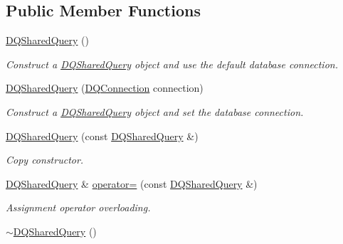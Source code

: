 \subsection*{Public Member Functions}
\begin{DoxyCompactItemize}
\item 
\hypertarget{classDQSharedQuery_adbd689f6a67939723233e5887388ee1d}{
\hyperlink{classDQSharedQuery_adbd689f6a67939723233e5887388ee1d}{DQSharedQuery} ()}
\label{classDQSharedQuery_adbd689f6a67939723233e5887388ee1d}

\begin{DoxyCompactList}\small\item\em Construct a \hyperlink{classDQSharedQuery}{DQSharedQuery} object and use the default database connection. \item\end{DoxyCompactList}\item 
\hypertarget{classDQSharedQuery_afd96448bf34f6bc77aa4e6ca448db8dd}{
\hyperlink{classDQSharedQuery_afd96448bf34f6bc77aa4e6ca448db8dd}{DQSharedQuery} (\hyperlink{classDQConnection}{DQConnection} connection)}
\label{classDQSharedQuery_afd96448bf34f6bc77aa4e6ca448db8dd}

\begin{DoxyCompactList}\small\item\em Construct a \hyperlink{classDQSharedQuery}{DQSharedQuery} object and set the database connection. \item\end{DoxyCompactList}\item 
\hypertarget{classDQSharedQuery_a090c2991347ee47a7091832f4ecf8bd4}{
\hyperlink{classDQSharedQuery_a090c2991347ee47a7091832f4ecf8bd4}{DQSharedQuery} (const \hyperlink{classDQSharedQuery}{DQSharedQuery} \&)}
\label{classDQSharedQuery_a090c2991347ee47a7091832f4ecf8bd4}

\begin{DoxyCompactList}\small\item\em Copy constructor. \item\end{DoxyCompactList}\item 
\hypertarget{classDQSharedQuery_a9e1ea6245fb87d36b910f688a8c49eac}{
\hyperlink{classDQSharedQuery}{DQSharedQuery} \& \hyperlink{classDQSharedQuery_a9e1ea6245fb87d36b910f688a8c49eac}{operator=} (const \hyperlink{classDQSharedQuery}{DQSharedQuery} \&)}
\label{classDQSharedQuery_a9e1ea6245fb87d36b910f688a8c49eac}

\begin{DoxyCompactList}\small\item\em Assignment operator overloading. \item\end{DoxyCompactList}\item 
\hypertarget{classDQSharedQuery_a03b413aee7220ade27ef99bc00f4cbc6}{
\hyperlink{classDQSharedQuery_a03b413aee7220ade27ef99bc00f4cbc6}{$\sim$DQSharedQuery} ()}
\label{classDQSharedQuery_a03b413aee7220ade27ef99bc00f4cbc6}


\end{DoxyCompactItemize}
